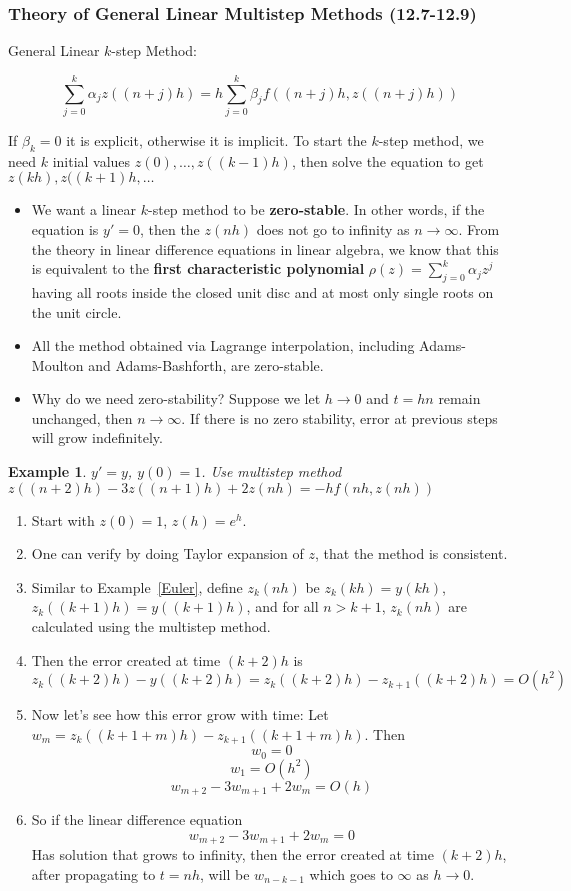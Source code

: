\documentclass{article} %
\theoremstyle{break}
\newtheorem{exa}[definition]{Example}
\begin{document}
\subsubsection{Theory of General Linear Multistep Methods (12.7-12.9)}

General Linear $k$-step Method:

\[\sum_{j=0}^k\alpha_jz((n+j)h)=h\sum_{j=0}^k\beta_jf((n+j)h, z((n+j)h))\]

If $\beta_k=0$ it is explicit, otherwise it is implicit. To start the $k$-step method, we need $k$ initial values $z(0), \dots, z((k-1)h)$, then solve the equation to get $z(kh), z((k+1)h, \dots$

\begin{itemize}  
\item We want a linear $k$-step method to be {\bf zero-stable}. In other words, if the equation is $y'=0$, then the $z(nh)$ does not go to infinity as $n\rightarrow\infty$. From the theory in linear difference equations in linear algebra, we know that this is equivalent to the {\bf first characteristic polynomial} $\rho(z)=\sum_{j=0}^k\alpha_jz^j$ having all roots inside the closed unit disc and at most only single roots on the unit circle.
\item All the method obtained via Lagrange interpolation, including Adams-Moulton and Adams-Bashforth, are zero-stable.


\item Why do we need zero-stability? Suppose we let $h\rightarrow 0$ and $t=hn$ remain unchanged, then $n\rightarrow\infty$. If there is no zero stability, error at previous steps will grow indefinitely.
\end{itemize}

\begin{exa}$y'=y$, $y(0)=1$. Use multistep method $z((n+2)h)-3z((n+1)h)+2z(nh)=-hf(nh, z(nh))$\end{exa}
\begin{enumerate}
\item Start with $z(0)=1$, $z(h)=e^h$.
\item One can verify by doing Taylor expansion of $z$, that the method is consistent.
\item Similar to Example~\ref{Euler}, define $z_k(nh)$ be $z_k(kh)=y(kh)$, $z_k((k+1)h)=y((k+1)h)$, and for all $n>k+1$, $z_k(nh)$ are calculated using the multistep method.
\item Then the error created at time $(k+2)h$ is
  \[z_k((k+2)h)-y((k+2)h)=z_k((k+2)h)-z_{k+1}((k+2)h)=O(h^2)\]

\item Now let's see how this error grow with time: Let $w_m=z_k((k+1+m)h)-z_{k+1}((k+1+m)h)$. Then
  \[w_0=0\]
  \[w_1=O(h^2)\]
  \[w_{m+2}-3w_{m+1}+2w_m=O(h)\]
\item So if the linear difference equation
  \[w_{m+2}-3w_{m+1}+2w_m=0\]
  Has solution that grows to infinity, then the error created at time $(k+2)h$, after propagating to $t=nh$, will be $w_{n-k-1}$ which goes to $\infty$ as $h\rightarrow 0$.
\end{enumerate}
\end{document}
